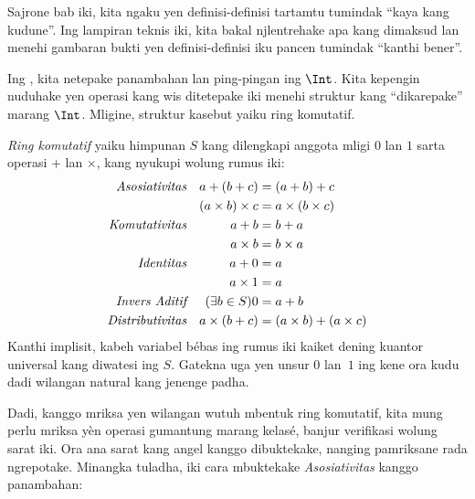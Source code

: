 \documentclass[../../../include/open-logic-section]{subfiles}
\begin{document}

Sajrone bab iki, kita ngaku yen definisi-definisi tartamtu tumindak
``kaya kang kudune''. Ing lampiran teknis iki, kita bakal njlentrehake
apa kang dimaksud lan menehi gambaran bukti yen definisi-definisi iku
pancen tumindak ``kanthi bener''.

Ing , kita netepake panambahan lan ping-pingan ing $\Int$.
Kita kepengin nuduhake yen operasi kang wis ditetepake iki menehi struktur
kang ``dikarepake'' marang $\Int$. Mligine, struktur kasebut yaiku ring
komutatif.

\begin{defn}
	\emph{Ring komutatif} yaiku himpunan $S$ kang dilengkapi anggota mligi
	$0$ lan $1$ sarta operasi $+$ lan $\times$, kang nyukupi wolung rumus iki:
	\begin{align*}
		\emph{Asosiativitas}&&a + (b+ c) & = (a + b) + c \\
		&& (a \times b) \times c & = a \times (b\times c)\\
		\emph{Komutativitas}&&a + b &= b+ a  \\
		&&  a \times b&= b\times a\\
		\emph{Identitas}&&a + 0 &= a \\
		&& a \times 1 &= a\\
		\emph{Invers Aditif}&&(\exists b\in S)0&=a + b\\
		\emph{Distributivitas}&&a \times (b+ c ) &= (a \times b) + (a \times c)
	\end{align*}
	Kanthi implisit, kabeh variabel bébas ing rumus iki kaiket dening kuantor
	universal kang diwatesi ing $S$. Gatekna uga yen unsur $0$ lan~$1$ ing
	kene ora kudu dadi wilangan natural kang jenenge padha.
\end{defn}

Dadi, kanggo mriksa yen wilangan wutuh mbentuk ring komutatif, kita mung
perlu mriksa yèn operasi gumantung marang kelasé, banjur verifikasi wolung sarat iki. Ora ana sarat kang {angel}
kanggo dibuktekake, nanging pamriksane rada ngrepotake. Minangka tuladha,
iki cara mbuktekake \emph{Asosiativitas} kanggo panambahan:
\end{document}
